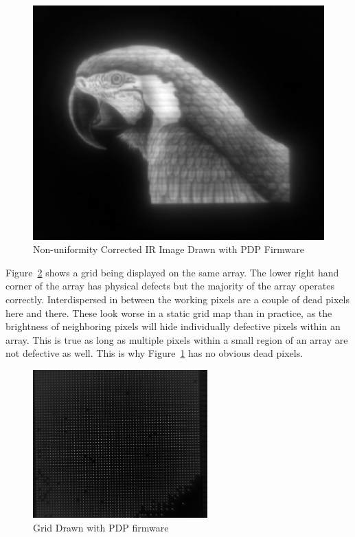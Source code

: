             \begin{figure}[t]
                \centering
                \includegraphics{fig/pdp_bird.png}
                \caption{Non-uniformity Corrected IR Image Drawn with PDP Firmware}
                \label{fig:pdp_bird}
            \end{figure}

            Figure~\ref{fig:pdp_grid} shows a grid being displayed on the same array. The lower right hand corner of the array has physical defects but the majority of the array operates correctly. Interdispersed in between the working pixels are a couple of dead pixels here and there. These look worse in a static grid map than in practice, as the brightness of neighboring pixels will hide individually defective pixels within an array. This is true as long as multiple pixels within a small region of an array are not defective as well. This is why Figure~\ref{fig:pdp_bird} has no obvious dead pixels.

            \begin{figure}[t]
                \centering
                \includegraphics[width=0.6\textwidth]{fig/pdp_grid.png}
                \caption{Grid Drawn with PDP firmware}
                \label{fig:pdp_grid}
            \end{figure}


